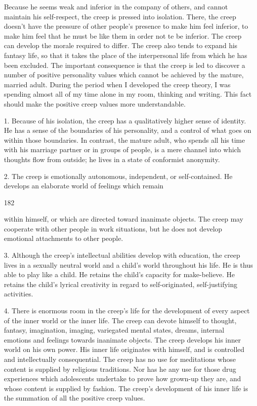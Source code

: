 \documentclass[10pt,twoside]{memoir}
\begin{document}
\begin{enumerate}
{\begin{enumerate}
\begin{sysrules}
\begin{sysrules}
\begin{sysrules}
\begin{sysrules}
{\begin{enumerate}
{{{{{{{Because he seems weak and inferior in the company of others, and 
cannot maintain his self-respect, the creep is pressed into isolation. There, 
the creep doesn't have the pressure of other people's presence to make him 
feel inferior, to make him feel that he must be like them in order not te be 
inferior. The creep can develop the morale required to differ. The creep also 
tends to expand his fantasy life, so that it takes the place of the 
interpersonal life from which he has been excluded. The important 
consequence is that the creep is led to discover a number of positive 
personality values which cannot be achieved by the mature, married adult. 
During the period when I developed the creep theory, I was spending almost 
all of my time alone in my room, thinking and writing. This fact should 
make the positive creep values more understandable. 

1. Because of his isolation, the creep has a qualitatively higher sense of 
identity. He has a sense of the boundaries of his personality, and a control of 
what goes on within those boundaries. In contrast, the mature adult, who 
spends all his time with his marriage partner or in groups of people, is a mere 
channel into which thoughts flow from outside; he lives in a state of 
conformist anonymity. 

2. The creep is emotionally autonomous, independent, or 
self-contained. He develops an elaborate world of feelings which remain 


182 


within himself, or which are directed toward inanimate objects. The creep 
may cooperate with other people in work situations, but he does not develop 
emotional attachments to other people. 

3. Although the creep's intellectual abilities develop with education, 
the creep lives in a sexually neutral world and a child's world throughout his 
life. He is thus able to play like a child. He retains the child's capacity for 
make-believe. He retains the child's lyrical creativity in regard to 
self-originated, self-justifying activities. 

4. There is enormous room in the creep's life for the development of 
every aspect of the inner world or the inner life. The creep can devote 
himself to thought, fantasy, imagination, imaging, variegated mental states, 
dreams, internal emotions and feelings towards inanimate objects. The creep 
develops his inner world on his own power. His inner life originates with 
himself, and is controlled and intellectually consequential. The creep has no 
use for meditations whose content is supplied by religious traditions. Nor has 
he any use for those drug experiences which adolescents undertake to prove 
how grown-up they are, and whose content is supplied by fashion. The 
creep's development of his inner life is the summation of all the positive 
creep values. 

}}}}}}}
\end{enumerate}}
\end{sysrules}
\end{sysrules}
\end{sysrules}
\end{sysrules}
\end{enumerate}}
\end{enumerate}
\end{document}
